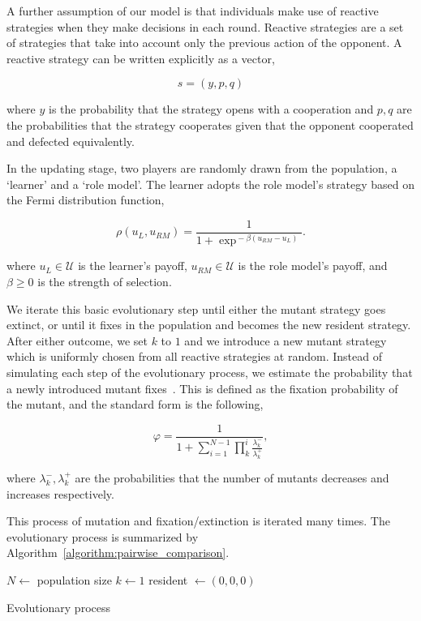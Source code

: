 \documentclass[11pt]{article}
\theoremstyle{plainCl1}
\theoremstyle{plainCl2}
\begin{document}
A further assumption of our model is that individuals make use of reactive
strategies when they make decisions in each round. Reactive strategies are a set
of strategies that take into account only the previous action of the opponent. A
reactive strategy can be written explicitly as a vector,

\[s=(y, p, q)\]

where \(y\) is the probability that the strategy opens with a cooperation and
\(p, q\) are the probabilities that the strategy cooperates given that the
opponent cooperated and defected equivalently.

In the updating stage, two players are randomly drawn from the population, a
`learner' and a `role model'. The learner adopts the role model's strategy based
on the Fermi distribution function, %

\begin{equation} \label{Eq:rho}
\rho(u_{L}, u_{RM}) = \frac{1}{1\!+\! \exp^{\!-\!\beta (u_{RM}\!-\!u_{L})}}.
\end{equation}

where $u_{L}\!\in\! \mathcal{U}$ is the learner's payoff, $u_{RM}\!\in\!
\mathcal{U}$ is the role model's payoff, and $\beta\!\ge\!0$ is the strength of
selection.

We iterate this basic evolutionary step until either the mutant strategy goes
extinct, or until it fixes in the population and becomes the new resident
strategy. After either outcome, we set $k$ to $1$ and we introduce a new mutant
strategy which is uniformly chosen from all reactive strategies at random.
Instead of simulating each step of the evolutionary process, we estimate the
probability that a newly introduced mutant fixes~\cite{nowak2004emergence}. This
is defined as the fixation probability of the mutant, and the standard form is
the following,

\begin{equation}\label{eq:appendix_fixation_probability}
\varphi = \frac{1}{1+\sum\limits_{i=1}^{N-1}\prod\limits_k^i \frac{\lambda^-_k}{\lambda^+_k}},
\end{equation}

where \(\lambda^-_k, \lambda^+_k\) are the probabilities that the number of
mutants decreases and increases respectively.

This process of mutation and fixation/extinction is iterated many times. The
evolutionary process is summarized by
Algorithm~\ref{algorithm:pairwise_comparison}.

\begin{algorithm}[!htbp]
  \SetAlgoLined $N \leftarrow$ population size\; $k \leftarrow 1$\; resident
   $\leftarrow (0, 0, 0)$\;  \caption{Evolutionary
   process}\label{algorithm:pairwise_comparison}
\end{algorithm}
\end{document}

